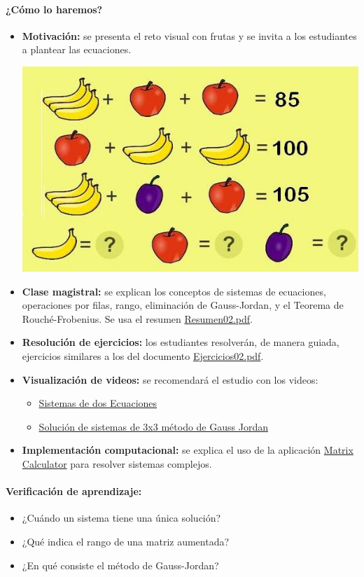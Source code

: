 \documentclass[a4,11pt]{aleph-notas}
\begin{document}
\paragraph{¿Cómo lo haremos?}  
\begin{itemize}[leftmargin=*]  
    \item \textbf{Motivación:} se presenta el reto visual con frutas y se invita a los estudiantes a plantear las ecuaciones. 
    \begin{center}
        \includegraphics[width=0.5\linewidth]{2-Clases/Figuras/sistema8bien.jpg}
    \end{center}
    \item \textbf{Clase magistral:} se explican los conceptos de sistemas de ecuaciones, operaciones por filas, rango, eliminación de Gauss-Jordan, y el Teorema de Rouché-Frobenius. Se usa el resumen \href{https://fcena-puce.github.io/FCENA-PUCE/AlgLinealyGeomAnalitica-05-N0068/2-Resumenes/Resumen02.pdf}{Resumen02.pdf}.  
    \item \textbf{Resolución de ejercicios:} los estudiantes resolverán, de manera guiada, ejercicios similares a los del documento \href{https://fcena-puce.github.io/FCENA-PUCE/AlgLinealyGeomAnalitica-05-N0068/2-Ejercicios/Ejercicios02.pdf}{Ejercicios02.pdf}.  
    \item \textbf{Visualización de videos:} se recomendará el estudio con los videos:  
    \begin{itemize}
        \item \href{https://www.youtube.com/watch?v=IF7WV5VVci4}{Sistemas de dos Ecuaciones}
        \item \href{https://www.youtube.com/watch?v=dFmGzr1j6eY}{Solución de sistemas de 3x3 método de Gauss Jordan}
    \end{itemize}  
    \item \textbf{Implementación computacional:} se explica el uso de la aplicación \href{https://matrixcalc.org/es/slu.html}{Matrix Calculator} para resolver sistemas complejos.
\end{itemize}  

\paragraph{Verificación de aprendizaje:}  
\begin{itemize}[leftmargin=*]  
    \item ¿Cuándo un sistema tiene una única solución?  
    \item ¿Qué indica el rango de una matriz aumentada?  
    \item ¿En qué consiste el método de Gauss-Jordan?  
\end{itemize}  
\end{document}
